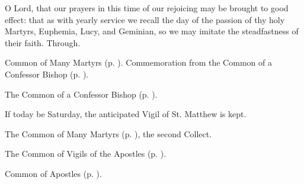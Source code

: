 \memorialCollect\label{EuphemiaCollect}
 O Lord, that our prayers in this time of our rejoicing may be brought to good effect: that as with yearly service we recall the day of the passion of thy holy Martyrs, Euphemia, Lucy, and Geminian, so we may imitate the steadfastness of their faith. Through.



\begin{rubric}
	Common of Many Martyrs (p. \pageref{CommonMartyrs}). Commemoration  from the Common of a Confessor Bishop (p. \pageref{ConfessorBishopCollect}).
\end{rubric}


\clearpage
{}

\begin{rubric}
	The Common of a Confessor Bishop (p. \pageref{ConfessorBishopCollect}).
\end{rubric}

\begin{rubric}
	If today be Saturday, the anticipated Vigil of St. Matthew is kept.
\end{rubric}



\begin{rubric}
	The Common of Many Martyrs (p. \pageref{CommonMartyrsNotBishopsCollect}), the second Collect.
\end{rubric}



\begin{rubric}
	The Common of Vigils of the Apostles (p. \pageref{CommonVigilApostles}).
\end{rubric}



\begin{rubric}
	Common of Apostles (p. \pageref{CommonApostles}).
\end{rubric}

